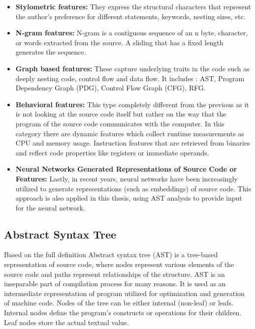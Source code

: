 \documentclass{article}
\begin{document}
\begin{itemize}

    \item \textbf{Stylometric features:} 
    They express the structural characters that represent the author’s preference for different statements, keywords, nesting sizes, etc.
    \item \textbf{N-gram features:}
    N-gram is a contiguous sequence of an n byte, character, or words extracted from the source. A sliding that has a fixed length generates 
    the sequence.
    \item \textbf{Graph based features:}
    These capture underlying traits in the code such as deeply nesting code, control flow and data flow.
    It includes : AST, Program Dependency Graph (PDG), Control Flow Graph (CFG), RFG.
    \item \textbf{Behavioral features:}
    This type completely different from the previous as it is not looking at the source code itself
    but rather on the way that the program of the source code communicates with the computer.
    In this category there are dynamic features which collect runtime measurements as CPU and memory usage.
    Instruction features that are retrieved from binaries and reflect code properties like registers or immediate operands.
    \item \textbf{Neural Networks Generated Representations of Source Code or Features:}
    Lastly, in recent years, neural networks have been increasingly utilized 
    to generate representations (such as embeddings) of source code. This 
    approach is also applied in this thesis, using AST analysis to provide 
    input for the neural network.

\end{itemize}

\subsection{Abstract Syntax Tree}

\quad Based on the full definition \cite{sun2023AST} Abstract syntax tree (AST) is a tree-based representation of source code, where nodes represent various elements of the source code 
and paths represent relationships of the structure. AST is an inseparable part of compilation process for many reasons. It is used as an 
intermediate representation of program utilized for optimization and generation of machine code. Nodes of the tree can be either internal 
(non-leaf) or leafs. Internal nodes define the program's constructs or operations for their children. Leaf nodes store the actual textual value. 
\end{document}
